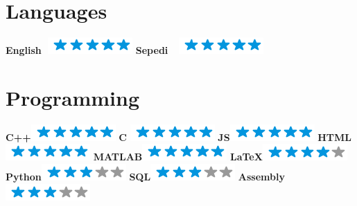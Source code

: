\documentclass[]{friggeri-cv}
\begin{document}
\begin{aside}
    \section{Languages}
    \textbf{English}\hspace{0.5mm}$\>\>\>$\includegraphics[scale=0.40]{img/5stars.png}
    \textbf{Sepedi}$\>\>\>\>\>$\includegraphics[scale=0.40]{img/5stars.png}
    ~
 \section{Programming}
    \textbf{C++}\hspace{0.9cm}\includegraphics[scale=0.4]{img/5stars.png}
    \textbf{C} \hspace{1.23cm}\includegraphics[scale=0.40]{img/5stars.png}
    \textbf{JS}\hspace{1.14cm}\includegraphics[scale=0.40]{img/5stars.png}
    \textbf{HTML}\hspace{0.60cm}\includegraphics[scale=0.40]{img/5stars.png}
    \textbf{MATLAB}\hspace{0.12cm}\includegraphics[scale=0.40]{img/5stars.png}
    \textbf{\LaTeX}\hspace{0.78cm}\includegraphics[scale=0.40]{img/4stars.png}
    \textbf{Python}\hspace{0.39cm}\includegraphics[scale=0.40]{img/3stars.png}
    \textbf{SQL}\hspace{0.88cm}\includegraphics[scale=0.40]{img/3stars.png}
    \textbf{Assembly}\hspace{-0.02cm}\includegraphics[scale=0.40]{img/3stars.png}
    ~

\end{aside}
\end{document}
